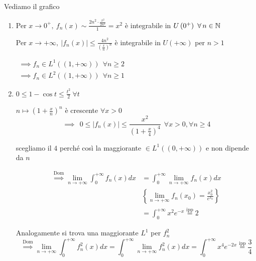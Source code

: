 Vediamo il grafico

\begin{enumerate}
\item Per $x\rightarrow 0^{+}, \ f_{n}(x) \sim \frac{2n^{2} \cdot \frac{x^{2}}{2n^{2}}}{1} = x^{2}$ è integrabile in $U\left(0^{+}\right) \ \forall n\in \NN $

Per $x\rightarrow + \infty, \ | f_{n}(x)| \leq \frac{4n^{2}}{\left(\frac{x}{n}\right)^{n}}$ è integrabile in $U(+ \infty)$ per $n > 1$

$ 
\begin{array}{l}
\implies f_{n} \in L^{1}((1, + \infty)) \ \ \forall n \geq 2\\
\implies f_{n} \in L^{2}((1, + \infty)) \ \ \forall n \geq 1
\end{array}$
\item $0 \leq 1 - \cos t \leq \frac{t^{2}}{2} \ \forall t$

$n\mapsto \left(1 + \frac{x}{n}\right)^{n}$ è crescente $\forall x > 0$
\begin{equation*}
\implies \ \ 0 \leq | f_{n} (x)| \leq \frac{x^{2}}{\left(1 + \frac{x}{4}\right)^{4}} \ \ \forall x > 0, \forall n \geq 4
\end{equation*}

scegliamo il $4$ perché così la maggiorante $\in L^{1}((0, + \infty))$ e non dipende da $n$

\begin{equation*}
\begin{aligned}
\overset{\text{Dom}}{\implies}\lim\limits_{n\rightarrow + \infty}\int^{+ \infty}_{0} f_{n}(x) dx & = \int^{+ \infty}_{0}\lim\limits_{n\rightarrow + \infty} f_{n}(x) dx\\
 & \left\{\lim\limits_{n\rightarrow + \infty} f_{n}(x_{0}) = \frac{x^{2}_{0}}{e^{x_{0}}}\right\}\\
 & = \int^{+ \infty}_{0} x^{2} e^{- x}\overset{\text{ipp}}{=} 2
\end{aligned}
\end{equation*}

Analogamente si trova una maggiorante $L^{1}$ per $f^{2}_{n}$
\begin{equation*}
\overset{\text{Dom}}{\implies}\lim\limits_{n\rightarrow + \infty}\int^{+ \infty}_{0} f^{2}_{n}(x) dx = \int^{+ \infty}_{0}\lim\limits_{n\rightarrow + \infty} f^{2}_{n}(x) dx = \int^{+ \infty}_{0} x^{4} e^{- 2x}\overset{\text{ipp}}{=}\frac{3}{4}
\end{equation*}
\end{enumerate}
